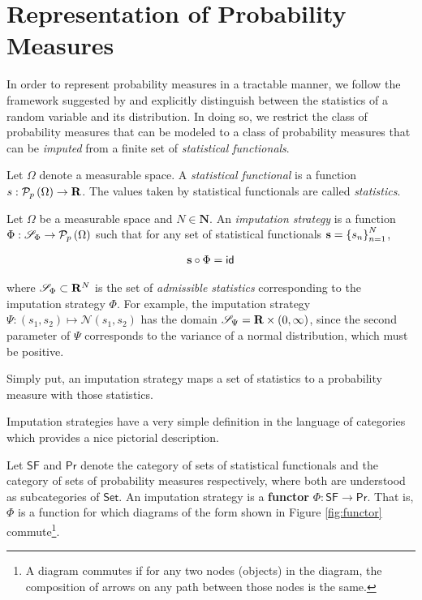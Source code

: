 \section{Representation of Probability Measures}\label{s:representation}
In order to represent probability measures in a tractable manner,
we follow the framework suggested by \citet{Rowland48495} and
explicitly distinguish between the statistics of a random variable and
its distribution. In doing so, we restrict the class of probability
measures that can be modeled to a class of probability measures that
can be \emph{imputed} from a finite set of \emph{statistical functionals}.

\begin{definition}\label{def:sf}
  Let $\Omega$ denote a measurable space. A \emph{statistical
    functional} is a function $s: \probset{\Omega}\to\mathbf{R}$. The
  values taken by statistical functionals are called \emph{statistics}.
\end{definition}

\begin{definition}\label{def:imputation-strategy} 
  Let $\Omega$ be a measurable space and $N\in\mathbf{N}$. An
  \emph{imputation strategy} is 
  a function $\Phi: \statsdomain{\Phi}\to\probset{\Omega}$ such that for any
  set of statistical functionals $\mathbf{s} = \indexedint{n}{N}{s}$,
  
  \begin{align*}
    \mathbf{s}\circ\Phi = \identity
  \end{align*}

  where $\statsdomain{\Phi}\subset\mathbf{R}^N$ is the set of \emph{admissible
  statistics} corresponding to the imputation strategy $\Phi$. For example,
  the imputation strategy $\Psi: (s_1, s_2)\mapsto\mathcal{N}(s_1, s_2)$ has
  the domain $\statsdomain{\Psi} = \mathbf{R}\times(0,\infty)$,
  since the second parameter of $\Psi$ corresponds to the variance of a normal
  distribution, which must be positive.

  Simply put, an imputation strategy maps a set of statistics to a
  probability measure with those statistics.
\end{definition}

Imputation strategies have a very simple definition in the language of
categories which provides a nice pictorial description.

\begin{proposition}\label{pro:imputation-strategy:categorical}
  Let $\mathsf{SF}$ and $\mathsf{Pr}$ denote the category of
  sets of statistical functionals and the category of sets of probability measures
  respectively, where both are understood as subcategories of
  $\mathsf{Set}$. An imputation strategy is a \textbf{functor} $\Phi:
  \mathsf{SF}\to\mathsf{Pr}$. That is, $\Phi$ is a function for which
  diagrams of the form shown in Figure \ref{fig:functor}
  commute\footnote{A diagram commutes if for any two nodes (objects)
    in the diagram, the composition of arrows on any path between
    those nodes is the same.}.
\end{proposition}

